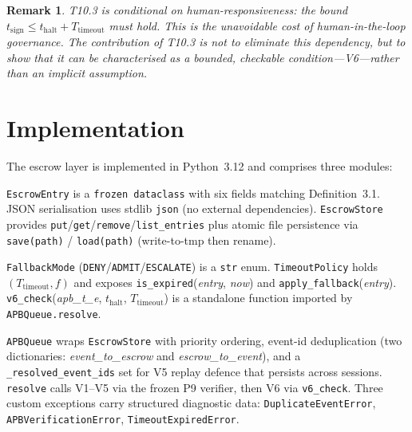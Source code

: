 \documentclass[11pt]{article}
\newtheorem{remark}{Remark}[section]
\newcommand{\DENY}{\texttt{DENY}}
\newcommand{\ADMIT}{\texttt{ADMIT}}
\newcommand{\ESCALATE}{\texttt{ESCALATE}}
\newcommand{\thalt}{t_{\mathrm{halt}}}
\newcommand{\tsign}{t_{\mathrm{sign}}}
\newcommand{\Ttimeout}{T_{\mathrm{timeout}}}
\begin{document}
\begin{remark}
T10.3 is conditional on \emph{human-responsiveness}: the bound
$\tsign \le \thalt + \Ttimeout$ must hold. This is the unavoidable
cost of human-in-the-loop governance. The contribution of T10.3 is
not to eliminate this dependency, but to show that it can be
characterised as a bounded, checkable condition---V6---rather than
an implicit assumption.
\end{remark}

\section{Implementation}
\label{sec:impl}

The escrow layer is implemented in Python~3.12 and comprises three
modules:

\begin{description}[itemsep=4pt]
  \item[\texttt{escrow/escrow\_store.py}]
    \texttt{EscrowEntry} is a \texttt{frozen dataclass} with six
    fields matching Definition~3.1. JSON serialisation uses stdlib
    \texttt{json} (no external dependencies). \texttt{EscrowStore}
    provides \texttt{put}/\texttt{get}/\texttt{remove}/\texttt{list\_entries}
    plus atomic file persistence via \texttt{save(path)} /
    \texttt{load(path)} (write-to-tmp then rename).

  \item[\texttt{escrow/timeout\_policy.py}]
    \texttt{FallbackMode} (\DENY/\ADMIT/\ESCALATE) is a \texttt{str}
    enum. \texttt{TimeoutPolicy} holds $(\Ttimeout, f)$ and exposes
    \texttt{is\_expired}(\textit{entry}, \textit{now}) and
    \texttt{apply\_fallback}(\textit{entry}).
    \texttt{v6\_check}(\textit{apb\_t\_e}, $\thalt$, $\Ttimeout$) is a
    standalone function imported by \texttt{APBQueue.resolve}.

  \item[\texttt{escrow/apb\_queue.py}]
    \texttt{APBQueue} wraps \texttt{EscrowStore} with priority ordering,
    event-id deduplication (two dictionaries: \textit{event\_to\_escrow}
    and \textit{escrow\_to\_event}), and a \texttt{\_resolved\_event\_ids}
    set for V5 replay defence that persists across sessions.
    \texttt{resolve} calls V1--V5 via the frozen P9 verifier, then V6
    via \texttt{v6\_check}. Three custom exceptions carry structured
    diagnostic data: \texttt{DuplicateEventError},
    \texttt{APBVerificationError}, \texttt{TimeoutExpiredError}.
\end{description}
\end{document}
